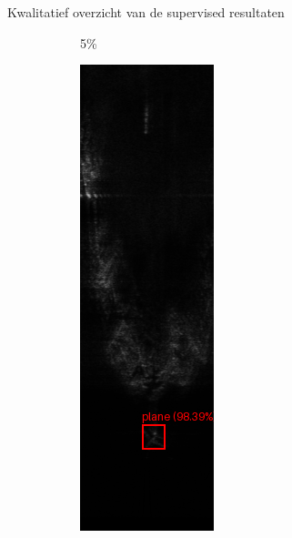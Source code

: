 \documentclass[aspectratio=169]{beamer}
\begin{document}
\begin{frame}{Kwalitatief overzicht van de supervised resultaten}
\begin{figure}
\begin{subfigure}{.15\textwidth}
                \caption[Voorspelling Faster R-CNN 5\%]{5\%}
            \end{subfigure}%
            \hfill
            \begin{subfigure}{.15\textwidth}
                \centering
                \captionsetup{justification=centering}
                \includegraphics[width=0.9\linewidth]{251_faster_rcnn_10pct.png}

\end{subfigure}
\end{figure}
\end{frame}
\end{document}
